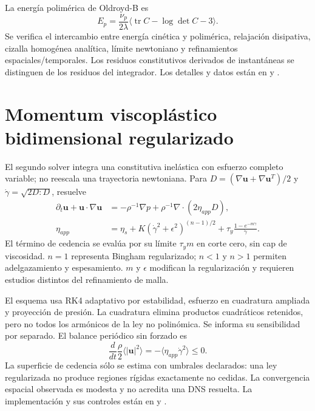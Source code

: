 \documentclass[11pt,oneside,openany]{book}
\DeclareMathOperator{\tr}{tr}
\begin{document}
La energía polimérica de Oldroyd-B es
\begin{equation}
 E_p=\frac{\nu_p}{2\lambda}\langle\tr C-\log\det C-3\rangle.
\end{equation}
Se verifica el intercambio entre energía cinética y polimérica, relajación
disipativa, cizalla homogénea analítica, límite newtoniano y refinamientos
espaciales/temporales. Los residuos constitutivos derivados de instantáneas
se distinguen de los residuos del integrador. Los detalles y datos están en
 y
.

\section{Momentum viscoplástico bidimensional regularizado}
El segundo solver integra una constitutiva inelástica con esfuerzo completo
variable; no reescala una trayectoria newtoniana. Para
$D=(\nabla\boldsymbol u+\nabla\boldsymbol u^T)/2$ y
$\dot\gamma=\sqrt{2D:D}$, resuelve
\begin{align}
 \partial_t\boldsymbol u+\boldsymbol u\cdot\nabla\boldsymbol u
  &=-\rho^{-1}\nabla p+\rho^{-1}\nabla\cdot(2\eta_{app}D),\\
 \eta_{app}&=\eta_s+K(\dot\gamma^2+\epsilon^2)^{(n-1)/2}
  +\tau_y\frac{1-e^{-m\dot\gamma}}{\dot\gamma}.
\end{align}
El término de cedencia se evalúa por su límite $\tau_y m$ en corte cero,
sin cap de viscosidad. $n=1$ representa Bingham regularizado; $n<1$ y $n>1$
permiten adelgazamiento y espesamiento. $m$ y $\epsilon$ modifican la
regularización y requieren estudios distintos del refinamiento de malla.

El esquema usa RK4 adaptativo por estabilidad, esfuerzo en cuadratura
ampliada y proyección de presión. La cuadratura elimina productos
cuadráticos retenidos, pero no todos los armónicos de la ley no polinómica.
Se informa su sensibilidad por separado. El balance periódico sin forzado es
\begin{equation}
 \frac{d}{dt}\frac{\rho}{2}\langle|\boldsymbol u|^2\rangle
  =-\langle\eta_{app}\dot\gamma^2\rangle\le0.
\end{equation}
La superficie de cedencia sólo se estima con umbrales declarados: una ley
regularizada no produce regiones rígidas exactamente no cedidas. La
convergencia espacial observada es modesta y no acredita una DNS resuelta.
La implementación y sus controles están en
 y
.
\end{document}
